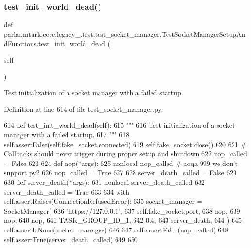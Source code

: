 \subsubsection{\texorpdfstring{test\+\_\+init\+\_\+world\+\_\+dead()}{test\_init\_world\_dead()}}
{\footnotesize\ttfamily def parlai.\+mturk.\+core.\+legacy\+\_.\+test.\+test\+\_\+socket\+\_\+manager.\+Test\+Socket\+Manager\+Setup\+And\+Functions.\+test\+\_\+init\+\_\+world\+\_\+dead (\begin{DoxyParamCaption}\item[{}]{self }\end{DoxyParamCaption})}

\begin{DoxyVerb}Test initialization of a socket manager with a failed startup.
\end{DoxyVerb}
 

Definition at line 614 of file test\+\_\+socket\+\_\+manager.\+py.


\begin{DoxyCode}
614     \textcolor{keyword}{def }test\_init\_world\_dead(self):
615         \textcolor{stringliteral}{"""}
616 \textcolor{stringliteral}{        Test initialization of a socket manager with a failed startup.}
617 \textcolor{stringliteral}{        """}
618         self.assertFalse(self.fake\_socket.connected)
619         self.fake\_socket.close()
620 
621         \textcolor{comment}{# Callbacks should never trigger during proper setup and shutdown}
622         nop\_called = \textcolor{keyword}{False}
623 
624         \textcolor{keyword}{def }nop(*args):
625             nonlocal nop\_called  \textcolor{comment}{# noqa 999 we don't support py2}
626             nop\_called = \textcolor{keyword}{True}
627 
628         server\_death\_called = \textcolor{keyword}{False}
629 
630         \textcolor{keyword}{def }server\_death(*args):
631             nonlocal server\_death\_called
632             server\_death\_called = \textcolor{keyword}{True}
633 
634         with self.assertRaises(ConnectionRefusedError):
635             socket\_manager = SocketManager(
636                 \textcolor{stringliteral}{'https://127.0.0.1'},
637                 self.fake\_socket.port,
638                 nop,
639                 nop,
640                 nop,
641                 TASK\_GROUP\_ID\_1,
642                 0.4,
643                 server\_death,
644             )
645             self.assertIsNone(socket\_manager)
646 
647         self.assertFalse(nop\_called)
648         self.assertTrue(server\_death\_called)
649 
650 
\end{DoxyCode}


